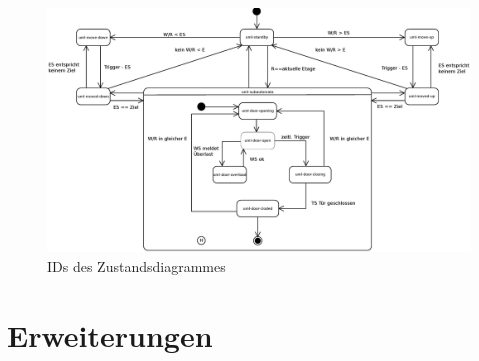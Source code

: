 \begin{figure}[hbt]
	\centering
	\includegraphics[width=\textwidth]{images/ZDv6_id_view.eps}
	\caption{IDs des Zustandsdiagrammes}%
	\label{fig:ZD_id_view}%
\end{figure}

\section{Erweiterungen}

